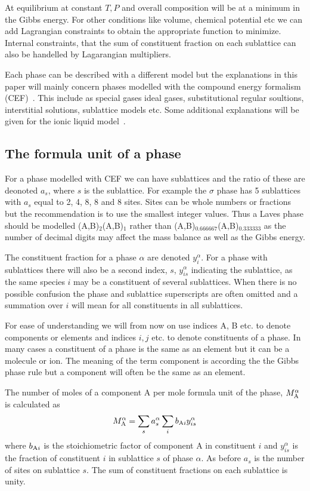 \documentclass[12pt]{article}
\begin{document}
At equilibrium at constant $T, P$ and overall composition will be at a
minimum in the Gibbs energy.  For other conditions like volume,
chemical potential etc we can add Lagrangian constraints to obtain
the appropriate function to minimize.  Internal constraints, that the
sum of constituent fraction on each sublattice can also be handelled
by Lagarangian multipliers.

Each phase can be described with a different model but the
explanations in this paper will mainly concern phases modelled with
the compound energy formalism (CEF)~\cite{81Sun,01Hil}.  This include
as special gases ideal gases, substitutional regular soultions,
interstitial solutions, sublattice models etc. Some additional
explanations will be given for the ionic liquid model~\cite{84Hil}.

\subsection{The formula unit of a phase}

For a phase modelled with CEF we can have sublattices and the ratio
of these are deonoted $a_s$, where $s$ is the sublattice.  For example
the $\sigma$ phase has 5 sublattices with $a_s$ equal to 2, 4, 8, 8
and 8 sites.  Sites can be whole numbers or fractions but the
recommendation is to use the smallest integer values.  Thus a Laves
phase should be modelled (A,B)$_2$(A,B)$_1$ rather than
(A,B)$_{0.666667}$(A,B)$_{0.333333}$ as the number of decimal digits
may affect the mass balance as well as the Gibbs energy.

The constituent fraction for a phase $\alpha$ are denoted
$y_i^{\alpha}$.  For a phase with sublattices there will also be a
second index, $s$, $y_{is}^{\alpha}$ indicating the sublattice, as the
same species $i$ may be a constituent of several sublattices.  When
there is no possible confusion the phase and sublattice superscripts
are often omitted and a summation over $i$ will mean for all
constituents in all sublattices.

For ease of understanding we will from now on use indices A, B etc. to
denote components or elements and indices $i, j$ etc. to denote
constituents of a phase.  In many cases a constituent of a phase is
the same as an element but it can be a molecule or ion.  The meaning
of the term component is according the the Gibbs phase rule but a
component will often be the same as an element.

The number of moles of a component A per mole formula unit of the
phase, $M^{\alpha}_{\rm A}$ is calculated as
\begin{equation}
M_{\rm A}^{\alpha} = \sum_s a_s^{\alpha} \sum_i b_{{\rm A}i}
y_{is}^{\alpha} \label{eq:massfun}
\end{equation}
where $b_{{\rm A}i}$ is the stoichiometric factor of component A in
constituent $i$ and $y^{\alpha}_{is}$ is the fraction of constituent
$i$ in sublattice $s$ of phase $\alpha$.  As before $a_s$ is the
number of sites on sublattice $s$.  The sum of constituent fractions
on each sublattice is unity.
\end{document}
